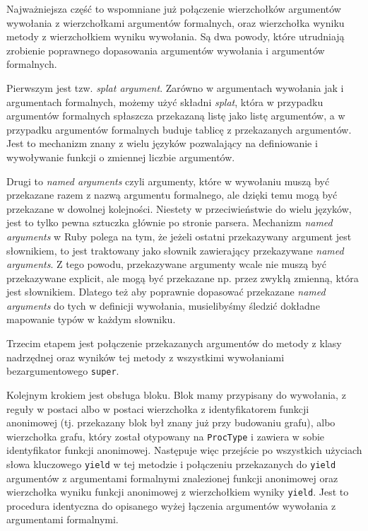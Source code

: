 \documentclass[declaration,shortabstract]{iithesis}
\begin{document}
Najważniejsza część to wspomniane już połączenie wierzchołków argumentów wywołania z wierzchołkami argumentów formalnych, oraz wierzchołka wyniku metody z wierzchołkiem wyniku wywołania. Są dwa powody, które utrudniają zrobienie poprawnego dopasowania argumentów wywołania i argumentów formalnych.

Pierwszym jest tzw. \textit{splat argument}. Zarówno w argumentach wywołania jak i argumentach formalnych, możemy użyć składni \textit{splat}, która w przypadku argumentów formalnych spłaszcza przekazaną listę jako listę argumentów, a w przypadku argumentów formalnych buduje tablicę z przekazanych argumentów. Jest to mechanizm znany z wielu języków pozwalający na definiowanie i wywoływanie funkcji o zmiennej liczbie argumentów. 

Drugi to \textit{named arguments} czyli argumenty, które w wywołaniu muszą być przekazane razem z nazwą argumentu formalnego, ale dzięki temu mogą być przekazane w dowolnej kolejności. Niestety w przeciwieństwie do wielu języków, jest to tylko pewna sztuczka głównie po stronie parsera. Mechanizm \textit{named arguments} w Ruby polega na tym, że jeżeli ostatni przekazywany argument jest słownikiem, to jest traktowany jako słownik zawierający przekazywane \textit{named arguments}. Z tego powodu, przekazywane argumenty wcale nie muszą być przekazywane explicit, ale mogą być przekazane np. przez zwykłą zmienną, która jest słownikiem. Dlatego też aby poprawnie dopasować przekazane \textit{named arguments} do tych w definicji wywołania, musielibyśmy śledzić dokładne mapowanie typów w każdym słowniku.

Trzecim etapem jest połączenie przekazanych argumentów do metody z klasy nadrzędnej oraz wyników tej metody z wszystkimi wywołaniami bezargumentowego \texttt{super}.

Kolejnym krokiem jest obsługa bloku. Blok mamy przypisany do wywołania, z reguły w postaci albo w postaci wierzchołka z identyfikatorem funkcji anonimowej (tj. przekazany blok był znany już przy budowaniu grafu), albo wierzchołka grafu, który został otypowany na \texttt{ProcType} i zawiera w sobie identyfikator funkcji anonimowej. Następuje więc przejście po wszystkich użyciach słowa kluczowego \texttt{yield} w tej metodzie i połączeniu przekazanych do \texttt{yield} argumentów z argumentami formalnymi znalezionej funkcji anonimowej oraz wierzchołka wyniku funkcji anonimowej z wierzchołkiem wyniky \texttt{yield}. Jest to procedura identyczna do opisanego wyżej łączenia argumentów wywołania z argumentami formalnymi.
\end{document}
